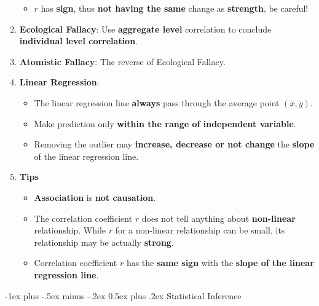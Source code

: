 \documentclass[10pt, landscape]{article}
\makeatletter
\renewcommand{\section}{\@startsection{section}{1}{0mm}%
                                {-1ex plus -.5ex minus -.2ex}%
                                {0.5ex plus .2ex}%
                                {\normalfont\large\bfseries}}
\makeatother
\begin{document}
\begin{multicols}{4}
\begin{enumerate}
\begin{itemize}
\begin{itemize}
        \end{itemize}
        \item $r$ has \textbf{sign}, thus \textbf{not having the same} change as \textbf{strength}, be careful!
    \end{itemize}
    \item \textbf{Ecological Fallacy}: Use \textbf{aggregate level} correlation to conclude \textbf{individual level correlation}.
    \item \textbf{Atomistic Fallacy}: The reverse of Ecological Fallacy.
    \item \textbf{Linear Regression}:
    \begin{itemize}
        \item The linear regression line \textbf{always} pass through the average point $(\bar x, \bar y)$.
        \item Make prediction only \textbf{within the range of independent variable}.
        \item Removing the outlier may \textbf{increase, decrease or not change} the \textbf{slope} of the linear regression line.
    \end{itemize}
    \item \textbf{Tips}
    \begin{itemize}
        \item \textbf{Association} is \textbf{not causation}.
        \item The correlation coefficient $r$ does not tell anything about \textbf{non-linear} relationship. While $r$ for a non-linear relationship can be small, its relationship may be actually \textbf{strong}.
        \item Correlation coefficient $r$ has the \textbf{same sign} with the \textbf{slope of the linear regression line}.
    \end{itemize}
\end{enumerate}

\section{Statistical Inference}

\end{multicols}
\end{document}
